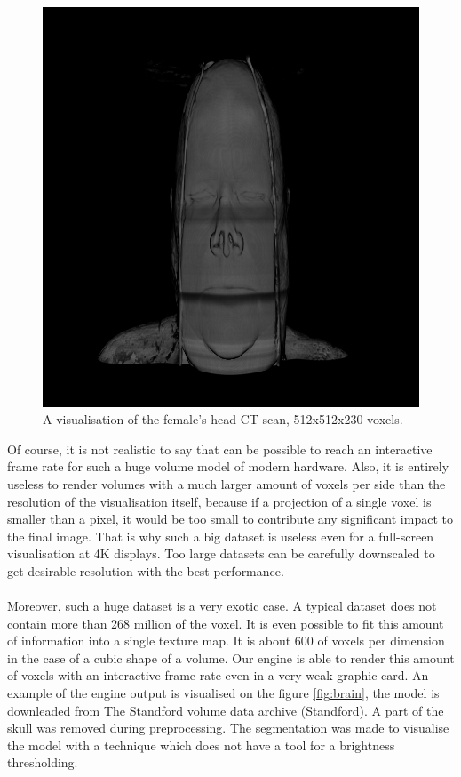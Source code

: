 \documentclass[twoside, english, 11pt]{report}
\begin{document}
\begin{figure}[H]
\centerline{\includegraphics[scale = 0.47]{img/head}}
\caption{A visualisation of the female's head CT-scan, 512x512x230 voxels. \label{fig:head}}
\end{figure}

Of course, it is not realistic to say that can be possible to reach an interactive frame rate for such a huge volume model of modern hardware. Also, it is entirely useless to render volumes with a much larger amount of voxels per side than the resolution of the visualisation itself, because if a projection of a single voxel is smaller than a pixel, it would be too small to contribute any significant impact to the final image. That is why such a big dataset is useless even for a full-screen visualisation at 4K displays. Too large datasets can be carefully downscaled to get desirable resolution with the best performance.\\\\

Moreover, such a huge dataset is a very exotic case. A typical dataset does not contain more than 268 million of the voxel. It is even possible to fit this amount of information into a single texture map. It is about 600 of voxels per dimension in the case of a cubic shape of a volume. Our engine is able to render this amount of voxels with an interactive frame rate even in a very weak graphic card. An example of the engine output is visualised on the figure \ref{fig:brain}, the model is downleaded from The Standford volume data archive (Standford). A part of the skull was removed during preprocessing. The segmentation was made to visualise the model with a technique which does not have a tool for a brightness thresholding.\\
\end{document}
